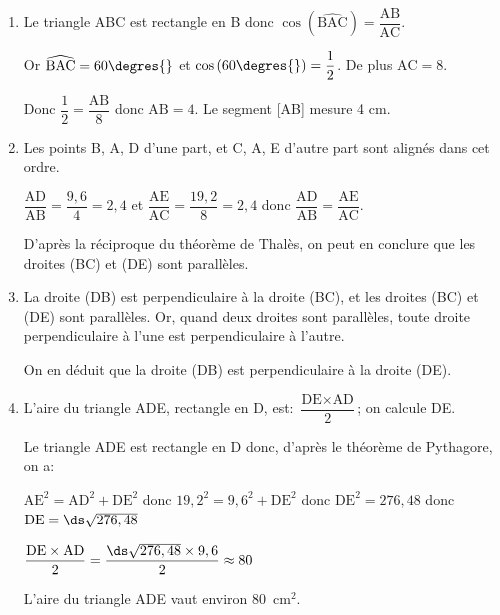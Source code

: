\begin{enumerate}
\item %
Le triangle ABC est rectangle en B donc
$\cos \left ( \widehat{\text{BAC}} \right )=\dfrac{\text{AB}}{\text{AC}}$.

Or $\widehat{\text{BAC}}=60\degres{}$ et $\cos \left (60\degres{}\right )=\dfrac{1}{2}$.
De plus $\text{AC}=8$.

Donc
$\dfrac{1}{2}= \dfrac{\text{AB}}{8}$
donc $\text{AB}=4$.
Le segment [AB] mesure 4 cm.

\item%
Les points B, A, D d'une part, et C, A, E d'autre part sont alignés dans cet ordre.

$\dfrac{\text{AD}}{\text{AB}} = \dfrac{9,6}{4}=2,4$
et
$\dfrac{\text{AE}}{\text{AC}} = \dfrac{19,2}{8}=2,4$
donc
$\dfrac{\text{AD}}{\text{AB}} = \dfrac{\text{AE}}{\text{AC}}$.

D'après la réciproque du théorème de Thalès, on peut en conclure que les droites (BC) et (DE) sont parallèles.

\item%
La droite (DB) est perpendiculaire à la droite (BC), et les droites (BC) et (DE) sont parallèles.
Or, quand deux droites sont parallèles, toute droite perpendiculaire à l'une est perpendiculaire à l'autre.

On en déduit que  la droite (DB) est perpendiculaire à la droite (DE).

\item L'aire du triangle ADE, rectangle en D, est:
$\dfrac{\text{DE}\times \text{AD}}{2}$; on calcule DE.

Le triangle ADE est rectangle en D donc, d'après le théorème de Pythagore, on a:

$\text{AE}^2 = \text{AD}^2 + \text{DE}^2$
donc
$19,2^2 = 9,6^2 + \text{DE}^2$ 
donc
$\text{DE}^2 = 276,48$ donc $\text{DE}= \ds\sqrt{276,48}$

$\dfrac{\text{DE}\times \text{AD}}{2}=\dfrac{\ds\sqrt{276,48}\times 9,6}{2}
\approx 80$

L'aire du triangle ADE vaut environ 80~cm$^2$.

\end{enumerate}


